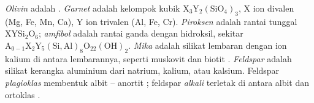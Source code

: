 \begin{definition}\label{def:b1:rock-forming-minerals:groups}
\emph{Olivin} adalah   . \emph{Garnet} adalah kelompok  kubik $\mathrm{X_3Y_2(SiO_4)_3}$, X ion divalen (Mg, Fe, Mn, Ca), Y ion trivalen (Al, Fe, Cr). \emph{Piroksen} adalah  rantai tunggal $\mathrm{XYSi_2O_6}$; \emph{amfibol} adalah  rantai ganda dengan hidroksil, sekitar $\mathrm{A_{0-1}X_2Y_5(Si,Al)_8O_{22}(OH)_2}$. \emph{Mika} adalah silikat lembaran dengan ion kalium di antara lembarannya, seperti muskovit  dan biotit . \emph{Feldspar} adalah silikat kerangka aluminium dari natrium, kalium, atau kalsium. Feldspar \emph{plagioklas} membentuk  albit  -- anortit ; feldspar \emph{alkali} terletak di antara albit dan ortoklas .
\end{definition}


